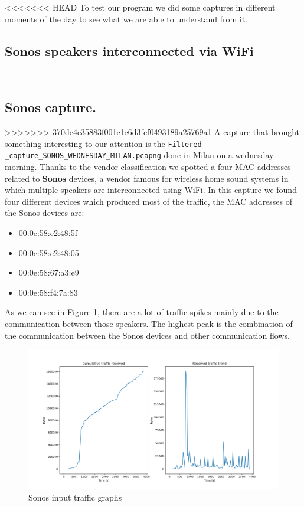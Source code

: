 
<<<<<<< HEAD
To test our program we did some captures in different moments of the day to see what we are able to 
understand from it.
\subsection{Sonos speakers interconnected via WiFi}
=======
\subsection{Sonos capture.}
>>>>>>> 370de4e35883f001c1c6d3fcf0493189a25769a1
 A capture that brought something interesting to our attention is the \texttt{Filtered
\_capture\_SONOS\_WEDNESDAY\_MILAN.pcapng} done in Milan on a wednesday morning. Thanks to the vendor 
classification we spotted a four MAC addresses related to \textbf{Sonos} devices, a vendor famous for
wireless home sound systems in which multiple speakers are interconnected using WiFi. In this capture 
we found four different devices which produced most of the traffic, the MAC addresses of the Sonos 
devices are:
\begin{itemize}
    \item 00:0e:58:c2:48:5f
    \item 00:0e:58:c2:48:05
    \item 00:0e:58:67:a3:e9
    \item 00:0e:58:f4:7a:83
\end{itemize}
As we can see in Figure \ref{fig:Sonos_traffic}, there are a lot of traffic spikes mainly due to the
communication between those speakers. The highest peak is the combination of the communication between
the Sonos devices and other communication flows.
\begin{figure}[h]
    \includegraphics[width=\textwidth]{Graphs/SONOS_cum_in_traffic.png}
    \caption{Sonos input traffic graphs}
    \label{fig:Sonos_traffic}
\end{figure}
